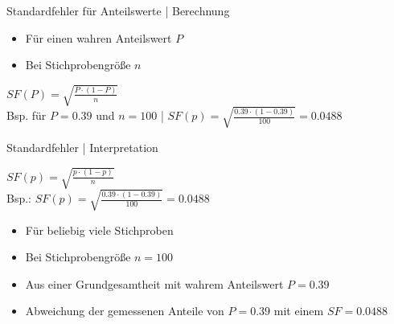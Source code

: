 \begin{frame}
  {Standardfehler für Anteilswerte | Berechnung}
  \begin{itemize}[<+->]
    \item Für einen wahren Anteilswert $P$
    \item Bei Stichprobengröße $n$
  \end{itemize}
  \Halbzeile
  \begin{center}
    \alert{$SF(P)=\sqrt{\frac{P\cdot(1-P)}{n}}$}\\
    \Doppelzeile
    Bsp. für $P=0.39$ und $n=100$ | $SF(p)=\sqrt{\frac{0.39\cdot(1-0.39)}{100}}=0.0488$
  \end{center}
\end{frame}

\begin{frame}
  {Standardfehler | Interpretation}
  \begin{center}
    \alert{$SF(p)=\sqrt{\frac{p\cdot(1-p)}{n}}$}\\

    \vspace{.1cm}
    Bsp.: $SF(p)=\sqrt{\frac{0.39\cdot(1-0.39)}{100}}=0.0488$
  \end{center}
  \Zeile
  \begin{itemize}[<+->]
    \item Für \alert{beliebig viele} Stichproben
    \item Bei \alert{Stichprobengröße $n=100$}
    \item Aus einer Grundgesamtheit mit \alert{wahrem Anteilswert $P=0.39$}
      \Halbzeile
    \item Abweichung der gemessenen Anteile von $P=0.39$ mit einem \alert{$SF=0.0488$}
  \end{itemize}
\end{frame}

